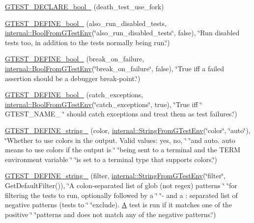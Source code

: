 \begin{DoxyCompactItemize}
\item 
\hyperlink{namespacetesting_a534f0743e7c42c55d27dcd0dd3d38f18}{G\+T\+E\+S\+T\+\_\+\+D\+E\+C\+L\+A\+R\+E\+\_\+bool\+\_\+} (death\+\_\+test\+\_\+use\+\_\+fork)
\item 
\hyperlink{namespacetesting_ad72f215c805a46fba44cb09d717b01ef}{G\+T\+E\+S\+T\+\_\+\+D\+E\+F\+I\+N\+E\+\_\+bool\+\_\+} (also\+\_\+run\+\_\+disabled\+\_\+tests, \hyperlink{namespacetesting_1_1internal_a67132cdce23fb71b6c38ee34ef81eb4c}{internal\+::\+Bool\+From\+G\+Test\+Env}(\char`\"{}also\+\_\+run\+\_\+disabled\+\_\+tests\char`\"{}, false), \char`\"{}Run disabled tests too, in addition to the tests normally being run.\char`\"{})
\item 
\hyperlink{namespacetesting_a5ab9e9cc2ee1addddfb2f4b43dd4e402}{G\+T\+E\+S\+T\+\_\+\+D\+E\+F\+I\+N\+E\+\_\+bool\+\_\+} (break\+\_\+on\+\_\+failure, \hyperlink{namespacetesting_1_1internal_a67132cdce23fb71b6c38ee34ef81eb4c}{internal\+::\+Bool\+From\+G\+Test\+Env}(\char`\"{}break\+\_\+on\+\_\+failure\char`\"{}, false), \char`\"{}True iff a failed assertion should be a debugger break-\/point.\char`\"{})
\item 
\hyperlink{namespacetesting_a96c82869676822ec883043aefb6dd042}{G\+T\+E\+S\+T\+\_\+\+D\+E\+F\+I\+N\+E\+\_\+bool\+\_\+} (catch\+\_\+exceptions, \hyperlink{namespacetesting_1_1internal_a67132cdce23fb71b6c38ee34ef81eb4c}{internal\+::\+Bool\+From\+G\+Test\+Env}(\char`\"{}catch\+\_\+exceptions\char`\"{}, true), \char`\"{}True iff \char`\"{} G\+T\+E\+S\+T\+\_\+\+N\+A\+M\+E\+\_\+ \char`\"{} should catch exceptions and treat them as test failures.\char`\"{})
\item 
\hyperlink{namespacetesting_a32f0280e95e7718835b0e3d2f7277269}{G\+T\+E\+S\+T\+\_\+\+D\+E\+F\+I\+N\+E\+\_\+string\+\_\+} (color, \hyperlink{namespacetesting_1_1internal_ac54dabc540bf79c2de91add679bfb93b}{internal\+::\+String\+From\+G\+Test\+Env}(\char`\"{}color\char`\"{}, \char`\"{}auto\char`\"{}), \char`\"{}Whether to use colors in the output.  Valid values\+: yes, no, \char`\"{} \char`\"{}and auto.  \textquotesingle{}auto\textquotesingle{} means to use colors if the output is \char`\"{} \char`\"{}being sent to a terminal and the T\+E\+RM environment variable \char`\"{} \char`\"{}is set to a terminal type that supports colors.\char`\"{})
\item 
\hyperlink{namespacetesting_a2830ee1f2237233fa44aa580c5a919ce}{G\+T\+E\+S\+T\+\_\+\+D\+E\+F\+I\+N\+E\+\_\+string\+\_\+} (filter, \hyperlink{namespacetesting_1_1internal_ac54dabc540bf79c2de91add679bfb93b}{internal\+::\+String\+From\+G\+Test\+Env}(\char`\"{}filter\char`\"{}, Get\+Default\+Filter()), \char`\"{}A colon-\/separated list of glob (not regex) patterns \char`\"{} \char`\"{}for filtering the tests to run, optionally followed by a \char`\"{} \char`\"{}\textquotesingle{}-\/\textquotesingle{} and a \+: separated list of negative patterns (tests to \char`\"{} \char`\"{}exclude).  \hyperlink{namespacetesting_a5e9134d655d2fc9323902348083282e7}{A} test is run if it matches one of the positive \char`\"{} \char`\"{}patterns and does not match any of the negative patterns.\char`\"{})

\end{DoxyCompactItemize}
